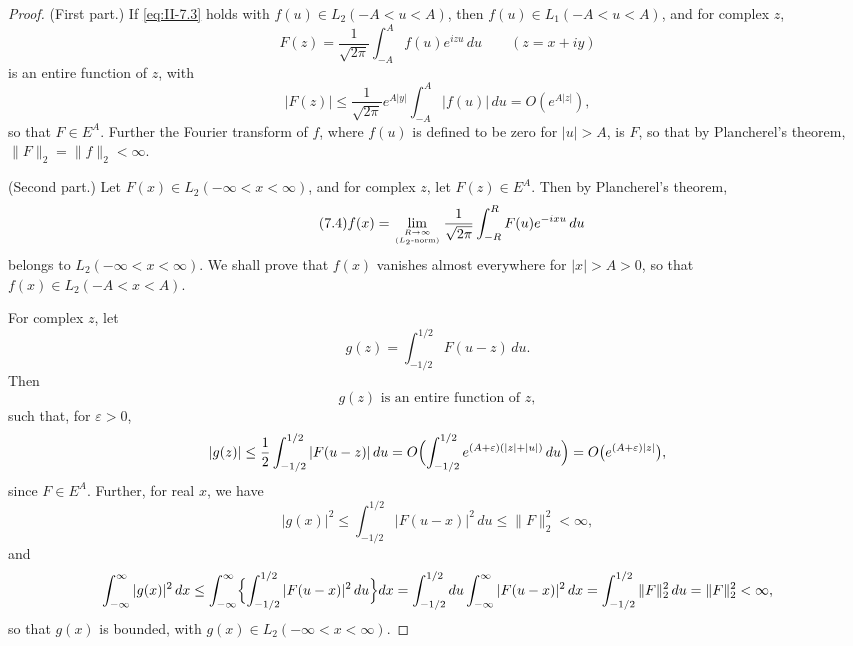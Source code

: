 \begin{proof}
(First part.) If \eqref{eq:II-7.3} holds with $f(u)\in L_{2}(-A<u<A)$, then $f(u)\in L_{1}(-A<u<A)$, and for complex $z$,
\[
F(z)=\frac{1}{\sqrt{2\pi}}\int_{-A}^{A}f(u)e^{izu}\,du\qquad(z=x+iy)
\]
is an entire function of $z$, with
\[
|F(z)|\le\frac{1}{\sqrt{2\pi}}e^{A|y|}\int_{-A}^{A}|f(u)|\,du=O(e^{A|z|}),
\]
so that $F\in E^{A}$. Further the Fourier transform of $f$, where $f(u)$ is defined to be zero for $|u|>A$, is $F$, so that by Plancherel's theorem, $\|F\|_{2}=\|f\|_{2}<\infty$.

(Second part.) Let $F(x)\in L_{2}(-\infty<x<\infty)$, and for complex $z$, let $F(z)\in E^{A}$. Then by Plancherel's theorem,
\begin{equation}\tag{7.4}\label{eq:II-7.4}
f(x)=\lim_{R\to\infty\atop(L_{2}\text{-norm})}\frac{1}{\sqrt{2\pi}}\int_{-R}^{R}F(u)e^{-ixu}\,du
\end{equation}
belongs to $L_{2}(-\infty<x<\infty)$. We shall prove that $f(x)$ vanishes almost everywhere for $|x|>A>0$, so that $f(x)\in L_{2}(-A<x<A)$.

For complex $z$, let
\begin{equation}\tag{7.5}\label{eq:II-7.5}
g(z)=\int_{-1/2}^{1/2}F(u-z)\,du.
\end{equation}
Then
\begin{equation}\tag{7.6}\label{eq:II-7.6}
g(z)\text{ is an entire function of }z,
\end{equation}
such that, for $\varepsilon>0$,
\[
|g(z)|\le\frac{1}{2}\int_{-1/2}^{1/2}|F(u-z)|\,du
=O\Bigl(\int_{-1/2}^{1/2}e^{(A+\varepsilon)(|z|+|u|)}\,du\Bigr)
=O\bigl(e^{(A+\varepsilon)|z|}\bigr),
\]
since $F\in E^{A}$. Further, for real $x$, we have
\begin{equation}\tag{7.7}\label{eq:II-7.7}
|g(x)|^{2}\le\int_{-1/2}^{1/2}|F(u-x)|^{2}\,du\le \|F\|_{2}^{2}<\infty,
\end{equation}
and
\[
\int_{-\infty}^{\infty}|g(x)|^{2}\,dx
\le\int_{-\infty}^{\infty}\Bigl\{\int_{-1/2}^{1/2}|F(u-x)|^{2}\,du\Bigr\}dx
=\int_{-1/2}^{1/2}du\int_{-\infty}^{\infty}|F(u-x)|^{2}\,dx
=\int_{-1/2}^{1/2}\|F\|_{2}^{2}\,du=\|F\|_{2}^{2}<\infty,
\]
so that $g(x)$ is bounded, with $g(x)\in L_{2}(-\infty<x<\infty)$.


\end{proof}
